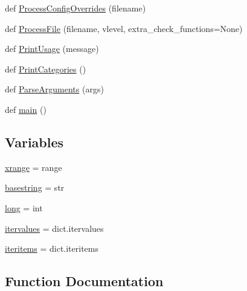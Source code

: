 \begin{DoxyCompactItemize}
\item 
def \hyperlink{namespacecpplint_a6b67f01b8b199f5f6a7481fc0fb53878}{Process\+Config\+Overrides} (filename)
\item 
def \hyperlink{namespacecpplint_a59b7dc731a8de535da0a5caadda53a36}{Process\+File} (filename, vlevel, extra\+\_\+check\+\_\+functions=None)
\item 
def \hyperlink{namespacecpplint_a57542503fc1cce3e5c7171fc32d6ba05}{Print\+Usage} (message)
\item 
def \hyperlink{namespacecpplint_a3b1a047aa772a0d7d049d29c8ee62aba}{Print\+Categories} ()
\item 
def \hyperlink{namespacecpplint_a57476f6a7321d342db7b7ca98d80bd27}{Parse\+Arguments} (args)
\item 
def \hyperlink{namespacecpplint_a03dd39c6bfb4337676fcfaf5cd797c91}{main} ()
\end{DoxyCompactItemize}
\subsection*{Variables}
\begin{DoxyCompactItemize}
\item 
\hyperlink{namespacecpplint_aa354ba81f1673ed31f2c0d7ce1f05f5e}{xrange} = range
\item 
\hyperlink{namespacecpplint_a509d6f2251ec740347ada9c519c235ee}{basestring} = str
\item 
\hyperlink{namespacecpplint_ab015cd61a1d1e48b317bd2a0be747e11}{long} = int
\item 
\hyperlink{namespacecpplint_a147fcba52cedae4991ee5b799777b022}{itervalues} = dict.\+itervalues
\item 
\hyperlink{namespacecpplint_a4264bdda2adcd8de2c47c06328e7b3cd}{iteritems} = dict.\+iteritems
\end{DoxyCompactItemize}


\subsection{Function Documentation}
